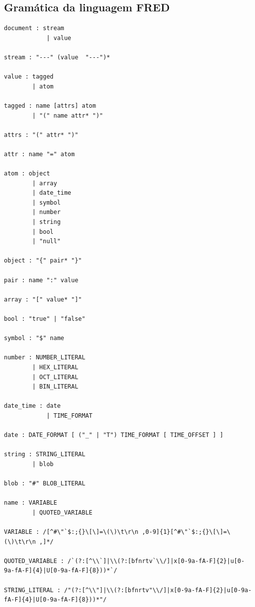 \begin{apendicesenv}

\partapendices

\chapter{Gramática da linguagem FRED}
\label{sec:fredgrammar}

\begin{lstlisting}[caption=Gramática em notação LARK para linguagem FRED,label={lst:fredgrammar}]
document : stream
            | value

stream : "---" (value  "---")*

value : tagged
        | atom

tagged : name [attrs] atom
        | "(" name attr* ")" 

attrs : "(" attr* ")"

attr : name "=" atom

atom : object
        | array
        | date_time
        | symbol
        | number
        | string
        | bool
        | "null"

object : "{" pair* "}"

pair : name ":" value

array : "[" value* "]"

bool : "true" | "false"

symbol : "$" name

number : NUMBER_LITERAL 
        | HEX_LITERAL
        | OCT_LITERAL
        | BIN_LITERAL 

date_time : date
            | TIME_FORMAT

date : DATE_FORMAT [ ("_" | "T") TIME_FORMAT [ TIME_OFFSET ] ]

string : STRING_LITERAL
        | blob

blob : "#" BLOB_LITERAL

name : VARIABLE
        | QUOTED_VARIABLE

VARIABLE : /[^#\"`$:;{}\[\]=\(\)\t\r\n ,0-9]{1}[^#\"`$:;{}\[\]=\(\)\t\r\n ,]*/

QUOTED_VARIABLE : /`(?:[^\\`]|\\(?:[bfnrtv`\\/]|x[0-9a-fA-F]{2}|u[0-9a-fA-F]{4}|U[0-9a-fA-F]{8}))*`/

STRING_LITERAL : /"(?:[^\\"]|\\(?:[bfnrtv"\\/]|x[0-9a-fA-F]{2}|u[0-9a-fA-F]{4}|U[0-9a-fA-F]{8}))*"/


\end{lstlisting}
\end{apendicesenv}
